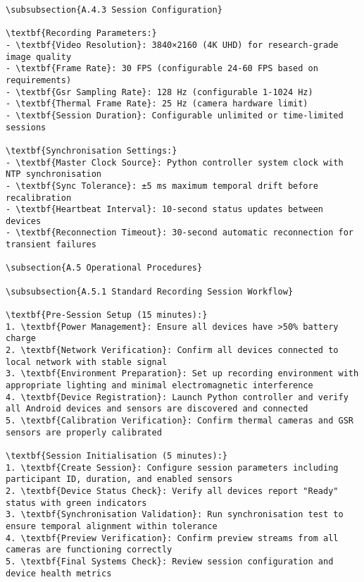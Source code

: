 \begin{verbatim}
\subsubsection{A.4.3 Session Configuration}

\textbf{Recording Parameters:}
- \textbf{Video Resolution}: 3840×2160 (4K UHD) for research-grade image quality
- \textbf{Frame Rate}: 30 FPS (configurable 24-60 FPS based on requirements)
- \textbf{Gsr Sampling Rate}: 128 Hz (configurable 1-1024 Hz)
- \textbf{Thermal Frame Rate}: 25 Hz (camera hardware limit)
- \textbf{Session Duration}: Configurable unlimited or time-limited sessions

\textbf{Synchronisation Settings:}
- \textbf{Master Clock Source}: Python controller system clock with NTP synchronisation
- \textbf{Sync Tolerance}: ±5 ms maximum temporal drift before recalibration
- \textbf{Heartbeat Interval}: 10-second status updates between devices
- \textbf{Reconnection Timeout}: 30-second automatic reconnection for transient failures

\subsection{A.5 Operational Procedures}

\subsubsection{A.5.1 Standard Recording Session Workflow}

\textbf{Pre-Session Setup (15 minutes):}
1. \textbf{Power Management}: Ensure all devices have >50% battery charge
2. \textbf{Network Verification}: Confirm all devices connected to local network with stable signal
3. \textbf{Environment Preparation}: Set up recording environment with appropriate lighting and minimal electromagnetic interference
4. \textbf{Device Registration}: Launch Python controller and verify all Android devices and sensors are discovered and connected
5. \textbf{Calibration Verification}: Confirm thermal cameras and GSR sensors are properly calibrated

\textbf{Session Initialisation (5 minutes):}
1. \textbf{Create Session}: Configure session parameters including participant ID, duration, and enabled sensors
2. \textbf{Device Status Check}: Verify all devices report "Ready" status with green indicators
3. \textbf{Synchronisation Validation}: Run synchronisation test to ensure temporal alignment within tolerance
4. \textbf{Preview Verification}: Confirm preview streams from all cameras are functioning correctly
5. \textbf{Final Systems Check}: Review session configuration and device health metrics


\end{verbatim}
